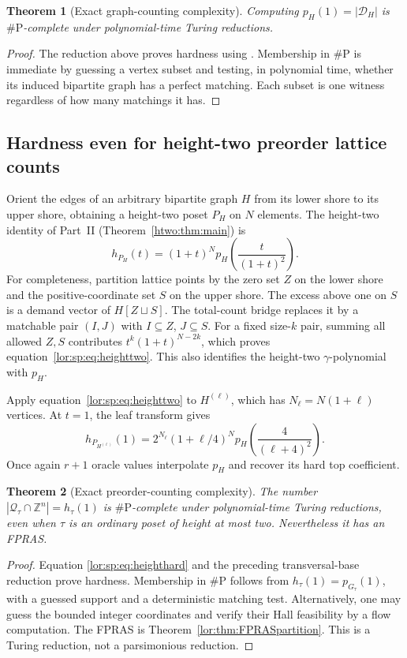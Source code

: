 \documentclass[11pt]{article}
\numberwithin{equation}{section}
\newtheorem{theorem}{Theorem}[section]
\theoremstyle{definition}
\newcommand{\Z}{\mathbb Z}
\newcommand{\Qt}{\mathcal Q_\tau}
\newcommand{\cD}{\mathcal D}
\begin{document}
\begin{theorem}[Exact graph-counting complexity]
\label{lor:sp:thm:graphhard}
Computing $p_H(1)=|\cD_H|$ is $\#\mathrm P$-complete under polynomial-time
Turing reductions.
\end{theorem}
\begin{proof}
The reduction above proves hardness using \cite{CPV}. Membership in
$\#\mathrm P$ is immediate by guessing a vertex subset and testing, in
polynomial time, whether its induced bipartite graph has a perfect matching.
Each subset is one witness regardless of how many matchings it has.
\end{proof}

\subsection{Hardness even for height-two preorder lattice counts}
Orient the edges of an arbitrary bipartite graph $H$ from its lower shore to
its upper shore, obtaining a height-two poset $P_H$ on $N$ elements. The
height-two identity of Part~II (Theorem~\ref{htwo:thm:main}) is
\begin{equation}
 h_{P_H}(t)=(1+t)^N p_H\left(\frac{t}{(1+t)^2}\right).
 \label{lor:sp:eq:heighttwo}
\end{equation}
For completeness, partition lattice points by the zero set $Z$ on the lower
shore and the positive-coordinate set $S$ on the upper shore. The excess
above one on $S$ is a demand vector of $H[Z\sqcup S]$. The total-count bridge
replaces it by a matchable pair $(I,J)$ with $I\subseteq Z$, $J\subseteq S$.
For a fixed size-$k$ pair, summing all allowed $Z,S$ contributes
$t^k(1+t)^{N-2k}$, which proves equation~\eqref{lor:sp:eq:heighttwo}. This also identifies the
height-two $\gamma$-polynomial with $p_H$.

Apply equation~\eqref{lor:sp:eq:heighttwo} to $H^{(\ell)}$, which has $N_\ell=N(1+\ell)$
vertices. At $t=1$, the leaf transform gives
\begin{equation}
 h_{P_{H^{(\ell)}}}(1)=
 2^{N_\ell}(1+\ell/4)^N
 p_H\left(\frac{4}{(\ell+4)^2}\right).
 \label{lor:sp:eq:heighthard}
\end{equation}
Once again $r+1$ oracle values interpolate $p_H$ and recover its hard top
coefficient.

\begin{theorem}[Exact preorder-counting complexity]
\label{lor:sp:thm:preorderhard}
The number $|\Qt\cap\Z^n|=h_\tau(1)$ is $\#\mathrm P$-complete under
polynomial-time Turing reductions, even when $\tau$ is an ordinary poset of
height at most two. Nevertheless it has an FPRAS.
\end{theorem}
\begin{proof}
Equation \eqref{lor:sp:eq:heighthard} and the preceding transversal-base reduction
prove hardness. Membership in $\#\mathrm P$ follows from
$h_\tau(1)=p_{G_\tau}(1)$, with a guessed support and a deterministic matching
test. Alternatively, one may guess the bounded integer coordinates and verify
their Hall feasibility by a flow computation. The FPRAS is
Theorem~\ref{lor:thm:FPRASpartition}. This is a Turing reduction, not a parsimonious reduction.
\end{proof}
\end{document}
